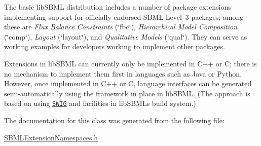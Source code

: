 The basic lib\+S\+B\+ML distribution includes a number of package extensions implementing support for officially-\/endorsed S\+B\+ML Level~3 packages; among these are {\itshape Flux Balance Constraints} (\char`\"{}fbc\char`\"{}), {\itshape Hierarchical Model Composition} (\char`\"{}comp\char`\"{}), {\itshape Layout} (\char`\"{}layout\char`\"{}), and {\itshape Qualitative Models} (\char`\"{}qual\char`\"{}). They can serve as working examples for developers working to implement other packages.

Extensions in lib\+S\+B\+ML can currently only be implemented in C++ or C; there is no mechanism to implement them first in languages such as Java or Python. However, once implemented in C++ or C, language interfaces can be generated semi-\/automatically using the framework in place in lib\+S\+B\+ML. (The approach is based on using \href{http://www.swig.org}{\tt S\+W\+IG} and facilities in lib\+S\+B\+ML\textquotesingle{}s build system.) 

The documentation for this class was generated from the following file\+:\begin{DoxyCompactItemize}
\item 
\hyperlink{_s_b_m_l_extension_namespaces_8h}{S\+B\+M\+L\+Extension\+Namespaces.\+h}\end{DoxyCompactItemize}
